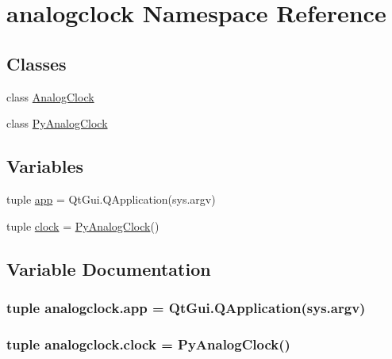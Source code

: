 \hypertarget{namespaceanalogclock}{}\section{analogclock Namespace Reference}
\label{namespaceanalogclock}
\subsection*{Classes}
\begin{DoxyCompactItemize}
\item 
class \hyperlink{classanalogclock_1_1AnalogClock}{Analog\+Clock}
\item 
class \hyperlink{classanalogclock_1_1PyAnalogClock}{Py\+Analog\+Clock}
\end{DoxyCompactItemize}
\subsection*{Variables}
\begin{DoxyCompactItemize}
\item 
tuple \hyperlink{namespaceanalogclock_a3dea33fb33ed5fbe6f172e87a22b16fa}{app} = Qt\+Gui.\+Q\+Application(sys.\+argv)
\item 
tuple \hyperlink{namespaceanalogclock_a0341d9c4b7dffd47555ec40d872d6d98}{clock} = \hyperlink{classanalogclock_1_1PyAnalogClock}{Py\+Analog\+Clock}()
\end{DoxyCompactItemize}


\subsection{Variable Documentation}
\hypertarget{namespaceanalogclock_a3dea33fb33ed5fbe6f172e87a22b16fa}{}
\subsubsection[{app}]{\setlength{\rightskip}{0pt plus 5cm}tuple analogclock.\+app = Qt\+Gui.\+Q\+Application(sys.\+argv)}\label{namespaceanalogclock_a3dea33fb33ed5fbe6f172e87a22b16fa}
\hypertarget{namespaceanalogclock_a0341d9c4b7dffd47555ec40d872d6d98}{}
\subsubsection[{clock}]{\setlength{\rightskip}{0pt plus 5cm}tuple analogclock.\+clock = {\bf Py\+Analog\+Clock}()}\label{namespaceanalogclock_a0341d9c4b7dffd47555ec40d872d6d98}
